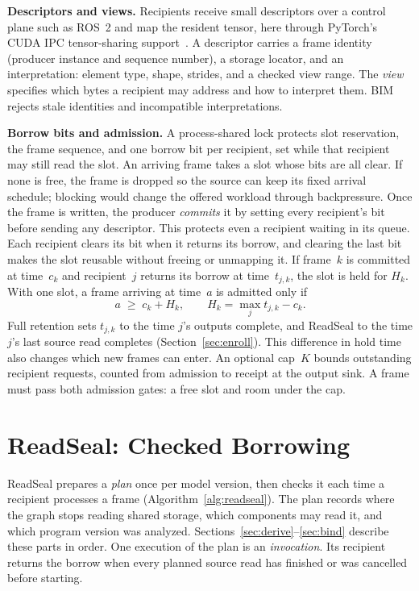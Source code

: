 \documentclass[conference]{IEEEtran}
\begin{document}
\textbf{Descriptors and views.} Recipients receive small descriptors over a control plane such as ROS~2 and map the resident tensor, here through PyTorch's CUDA IPC tensor-sharing support~\cite{torchmp}. A descriptor carries a frame identity (producer instance and sequence number), a storage locator, and an interpretation: element type, shape, strides, and a checked view range. The \emph{view} specifies which bytes a recipient may address and how to interpret them. BIM rejects stale identities and incompatible interpretations.

\textbf{Borrow bits and admission.} A process-shared lock protects slot reservation, the frame sequence, and one borrow bit per recipient, set while that recipient may still read the slot. An arriving frame takes a slot whose bits are all clear. If none is free, the frame is dropped so the source can keep its fixed arrival schedule; blocking would change the offered workload through backpressure. Once the frame is written, the producer \emph{commits} it by setting every recipient's bit before sending any descriptor. This protects even a recipient waiting in its queue. Each recipient clears its bit when it returns its borrow, and clearing the last bit makes the slot reusable without freeing or unmapping it. If frame~$k$ is committed at time~$c_k$ and recipient~$j$ returns its borrow at time~$t_{j,k}$, the slot is held for $H_k$. With one slot, a frame arriving at time~$a$ is admitted only if
\begin{equation}
a\;\ge\; c_k+H_k, \qquad H_k=\max_j t_{j,k}-c_k. \label{eq:hold}
\end{equation}
Full retention sets $t_{j,k}$ to the time $j$'s outputs complete, and ReadSeal to the time $j$'s last source read completes (Section~\ref{sec:enroll}). This difference in hold time also changes which new frames can enter. An optional cap~$K$ bounds outstanding recipient requests, counted from admission to receipt at the output sink. A frame must pass both admission gates: a free slot and room under the cap.

\section{ReadSeal: Checked Borrowing}
\label{sec:readseal}

ReadSeal prepares a \emph{plan} once per model version, then checks it each time a recipient processes a frame (Algorithm~\ref{alg:readseal}). The plan records where the graph stops reading shared storage, which components may read it, and which program version was analyzed. Sections~\ref{sec:derive}--\ref{sec:bind} describe these parts in order. One execution of the plan is an \emph{invocation}. Its recipient returns the borrow when every planned source read has finished or was cancelled before starting.
\end{document}
